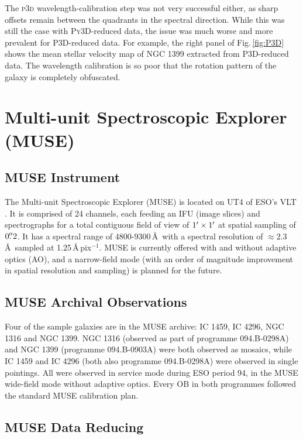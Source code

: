 		The \textsc{p3d} wavelength-calibration step was not very successful either, as sharp offsets remain between the quadrants in the spectral direction. While this was still the case with \textsc{Py3D}-reduced data, the issue was much worse and more prevalent for \textsc{P3D}-reduced data. For example, the right panel of Fig.\,\ref{fig:P3D} shows the mean stellar velocity map of NGC 1399 extracted from \textsc{P3D}-reduced data. The wavelength calibration is so poor that the rotation pattern of the galaxy is completely obfuscated.

		
\section{Multi-unit Spectroscopic Explorer (MUSE)}
	\label{sec:MUSE}

	\subsection{MUSE Instrument}
		The Multi-unit Spectroscopic Explorer (MUSE) is located on UT4 of ESO's VLT \citep{Bacon2010}. It is comprised of 24 channels, each feeding an IFU (image slices) and spectrographs for a total contiguous field of view of $1\hbox{$^\prime$} \times 1\hbox{$^\prime$}$ at spatial sampling of $0\hbox{$.\!\!^{\prime\prime}$}2$. It has a spectral range of 4800-9300\,\AA\ with a spectral resolution of $\approx 2.3$\,\AA\ sampled at 1.25\,\AA\,pix$^{-1}$. MUSE is currently offered with and without adaptive optics (AO), and a narrow-field mode (with an order of magnitude improvement in spatial resolution and sampling) is planned for the future. 
		
	\subsection{MUSE Archival Observations}
		Four of the sample galaxies are in the MUSE archive: IC 1459, IC 4296, NGC 1316 and NGC 1399. NGC 1316 (observed as part of programme 094.B-0298A) and NGC 1399 (programme 094.B-0903A) were both observed as mosaics, while IC 1459 and IC 4296 (both also programme 094.B-0298A) were observed in single pointings. All were observed in service mode during ESO period 94, in the MUSE wide-field mode without adaptive optics. Every OB in both programmes followed the standard MUSE calibration plan.

	\subsection{MUSE Data Reducing}
		\label{subsec:MUSEreduction}
		
